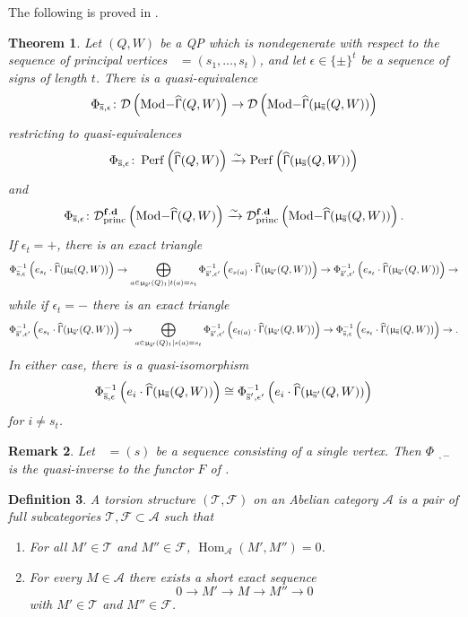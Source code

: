 \documentclass[a4paper,10pt]{amsart}
\newtheorem{theorem}{Theorem}[section]
\newtheorem{definition}[theorem]{Definition}
\newtheorem{remark}[theorem]{Remark}
\renewcommand{\Gamma}{\Upgamma}
\renewcommand{\mu}{\upmu}
\DeclareMathOperator{\Hom}{Hom}
\DeclareMathOperator{\fd}{\mathbf{f.d}}
\DeclareMathOperator{\Tmod}{Mod-}
\newcommand{\Rmod}[1]{\Tmod\!#1}
\DeclareMathOperator{\Perf}{Perf}
\DeclareMathOperator{\HGamma}{\widehat{\Gamma}}
\DeclareMathOperator{\princ}{princ}
\DeclareMathOperator{\Ss}{\overline{s}}
\newcommand{\Dub}{\mathcal{D}}
\begin{document}
The following is proved in \cite[Thm.3.2, Rem.3.3]{KellerMutations}.
\begin{theorem}
\label{KYThm}
Let $(Q,W)$ be a QP which is nondegenerate with respect to the sequence of principal vertices $\Ss=(s_1,\ldots,s_t)$, and let $\epsilon\in\{\pm \}^{t}$ be a sequence of signs of length $t$.  There is a quasi-equivalence
\[
\Phi_{\Ss,\epsilon}\colon \Dub\left(\Rmod{\HGamma(Q,W)}\right)\rightarrow \Dub\left(\Rmod{\HGamma(\mu_{\Ss}(Q,W))}\right)
\]
restricting to quasi-equivalences
\[
\Phi_{\Ss,\epsilon}\colon\Perf\left(\HGamma(Q,W)\right)\xrightarrow{\sim}\Perf\left(\HGamma(\mu_{\Ss}(Q,W))\right)
\]
and
\begin{equation}
\label{fdRes}
\Phi_{\Ss,\epsilon}\colon\Dub^{\fd}_{\princ}\left(\Rmod{\HGamma(Q,W)}\right)\xrightarrow{\sim}\Dub^{\fd}_{\princ}\left(\Rmod{\HGamma(\mu_{\Ss}(Q,W))}\right).
\end{equation}
If $\epsilon_{t}=+$, there is an exact triangle
\begin{equation}
\label{plusCase}
\Phi^{-1}_{\Ss,\epsilon}\left(e_{s_t}\cdot\HGamma(\mu_{\Ss}(Q,W))\right)\rightarrow\bigoplus_{a\in \mu_{\Ss'}(Q)_1|t(a)=s_t}\Phi^{-1}_{\Ss',\epsilon'}\left(e_{s(a)}\cdot\HGamma(\mu_{\Ss'}(Q,W))\right)\rightarrow \Phi^{-1}_{\Ss',\epsilon'}\left(e_{s_t}\cdot \HGamma(\mu_{\Ss'}(Q,W))\right)\rightarrow
\end{equation}
while if $\epsilon_t=-$ there is an exact triangle
\begin{equation}
\label{minusCase}
\Phi^{-1}_{\Ss',\epsilon'}\left(e_{s_t}\cdot \HGamma(\mu_{\Ss'}(Q,W))\right)\rightarrow\bigoplus_{a\in \mu_{\Ss'}(Q)_1|s(a)=s_t}\Phi^{-1}_{\Ss',\epsilon'}\left(e_{t(a)}\cdot \HGamma(\mu_{\Ss'}(Q,W))\right)\rightarrow \Phi_{\Ss,\epsilon}^{-1}\left(e_{s_t}\cdot \HGamma(\mu_{\Ss}(Q,W))\right)\rightarrow.
\end{equation}
In either case, there is a quasi-isomorphism 
\begin{equation}
\label{unchanged}
\Phi_{\Ss,\epsilon}^{-1}\left(e_{i}\cdot\HGamma(\mu_{\Ss}(Q,W))\right)\cong \Phi_{\Ss',\epsilon'}^{-1}\left(e_{i}\cdot \HGamma(\mu_{\Ss'}(Q,W))\right)
\end{equation}
for $i\neq s_t$.
\end{theorem}
\begin{remark}
Let $\Ss=(s)$ be a sequence consisting of a single vertex.  Then $\Phi_{\Ss,-}$ is the quasi-inverse to the functor $F$ of \cite[Thm.3.2]{KellerMutations}.
\end{remark}
\begin{definition}
A torsion structure $(\mathcal{T},\mathcal{F})$ on an Abelian category $\mathcal{A}$ is a pair of full subcategories $\mathcal{T},\mathcal{F}\subset\mathcal{A}$ such that
\begin{enumerate}
\item
For all $M'\in\mathcal{T}$ and $M''\in\mathcal{F}$, $\Hom_{\mathcal{A}}(M',M'')=0$.
\item
For every $M\in \mathcal{A}$ there exists a short exact sequence
\[
0\rightarrow M'\rightarrow M\rightarrow M''\rightarrow 0
\]
with $M'\in\mathcal{T}$ and $M''\in\mathcal{F}$.
\end{enumerate}
\end{definition}
\end{document}
